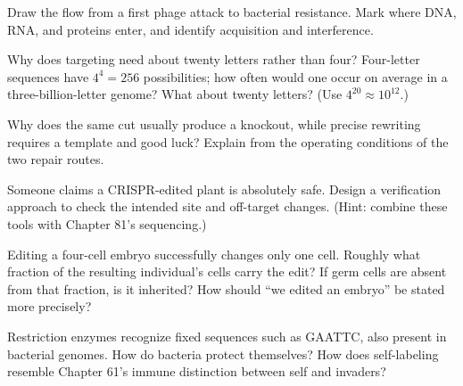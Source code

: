 \begin{sikaoti}
\item Draw the flow from a first phage attack to bacterial resistance. Mark where DNA, RNA, and proteins enter, and identify acquisition and interference.
\item Why does targeting need about twenty letters rather than four? Four-letter sequences have $4^4=256$ possibilities; how often would one occur on average in a three-billion-letter genome? What about twenty letters? (Use $4^{20}\approx 10^{12}$.)
\item Why does the same cut usually produce a knockout, while precise rewriting requires a template and good luck? Explain from the operating conditions of the two repair routes.
\item Someone claims a CRISPR-edited plant is absolutely safe. Design a verification approach to check the intended site and off-target changes. (Hint: combine these tools with Chapter 81's sequencing.)
\item Editing a four-cell embryo successfully changes only one cell. Roughly what fraction of the resulting individual's cells carry the edit? If germ cells are absent from that fraction, is it inherited? How should ``we edited an embryo'' be stated more precisely?
\item Restriction enzymes recognize fixed sequences such as GAATTC, also present in bacterial genomes. How do bacteria protect themselves? How does self-labeling resemble Chapter 61's immune distinction between self and invaders?
\end{sikaoti}
